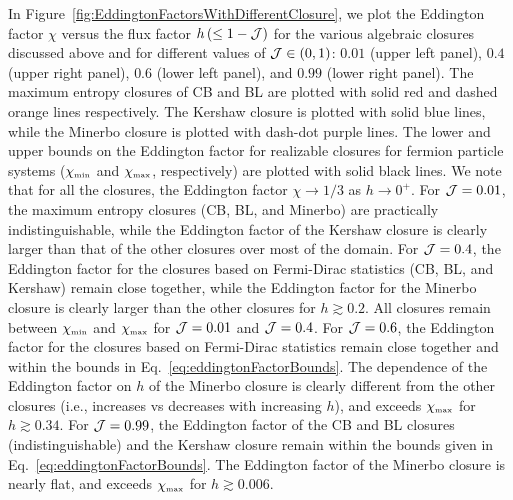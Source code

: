 In Figure~\ref{fig:EddingtonFactorsWithDifferentClosure}, we plot the Eddington factor $\chi$ versus the flux factor $h\,(\le 1-\mathcal{J})$ for the various algebraic closures discussed above and for different values of $\mathcal{J}\in(0,1)$: $0.01$ (upper left panel), $0.4$ (upper right panel), $0.6$ (lower left panel), and $0.99$ (lower right panel).  
The maximum entropy closures of CB and BL are plotted with solid red and dashed orange lines respectively.  
The Kershaw closure is plotted with solid blue lines, while the Minerbo closure is plotted with dash-dot purple lines.  
The lower and upper bounds on the Eddington factor for realizable closures for fermion particle systems ($\chi_{\mbox{\tiny min}}$ and $\chi_{\mbox{\tiny max}}$, respectively) are plotted with solid black lines.  
We note that for all the closures, the Eddington factor $\chi\to1/3$ as $h\to0^{+}$.  
For $\mathcal{J}=0.01$, the maximum entropy closures (CB, BL, and Minerbo) are practically indistinguishable, while the Eddington factor of the Kershaw closure is clearly larger than that of the other closures over most of the domain.  
For $\mathcal{J}=0.4$, the Eddington factor for the closures based on Fermi-Dirac statistics (CB, BL, and Kershaw) remain close together, while the Eddington factor for the Minerbo closure is clearly larger than the other closures for $h\gtrsim0.2$.  
All closures remain between $\chi_{\mbox{\tiny min}}$ and $\chi_{\mbox{\tiny max}}$ for $\mathcal{J}=0.01$ and $\mathcal{J}=0.4$.  
For $\mathcal{J}=0.6$, the Eddington factor for the closures based on Fermi-Dirac statistics remain close together and within the bounds in Eq.~\eqref{eq:eddingtonFactorBounds}.  
The dependence of the Eddington factor on $h$ of the Minerbo closure is clearly different from the other closures (i.e., increases vs decreases with increasing $h$), and exceeds $\chi_{\mbox{\tiny max}}$ for $h\gtrsim0.34$.  
For $\mathcal{J}=0.99$, the Eddington factor of the CB and BL closures (indistinguishable) and the Kershaw closure remain within the bounds given in Eq.~\eqref{eq:eddingtonFactorBounds}.  
The Eddington factor of the Minerbo closure is nearly flat, and exceeds $\chi_{\mbox{\tiny max}}$ for $h\gtrsim0.006$.  
